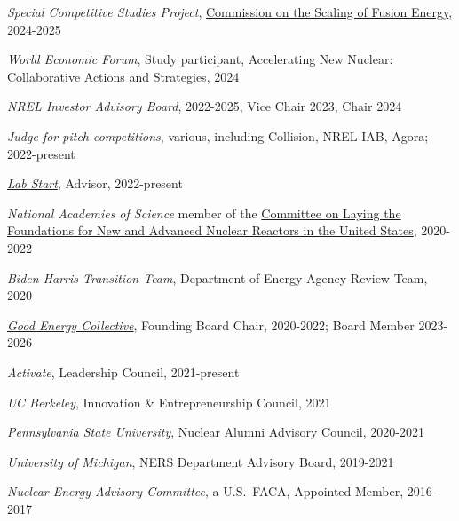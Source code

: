 \textit{Special Competitive Studies Project}, \href{https://www.scsp.ai/fusion/}{Commission on the Scaling of Fusion Energy}, 2024-2025

\textit{World Economic Forum}, Study participant, Accelerating New Nuclear: Collaborative Actions and Strategies, 2024

\textit{NREL Investor Advisory Board}, 2022-2025, Vice Chair 2023, Chair 2024

\textit{Judge for pitch competitions}, various, including Collision, NREL IAB, Agora; 2022-present

\textit{\href{https://www.labstart.xyz/}{Lab Start}}, Advisor, 2022-present

\textit{National Academies of Science} member of the \href{https://www.nationalacademies.org/our-work/laying-the-foundation-for-new-and-advanced-nuclear-reactors-in-the-united-states#sectionCommittee}{Committee on Laying the
Foundations for New and Advanced Nuclear Reactors in the United States},
2020-2022

\textit{Biden-Harris Transition Team}, Department of Energy Agency Review Team, 2020

\textit{\href{https://www.goodenergycollective.org/}{Good Energy Collective}},
Founding Board Chair, 2020-2022; Board Member 2023-2026

\textit{Activate}, Leadership Council, 2021-present

\textit{UC Berkeley}, Innovation \&  Entrepreneurship Council, 2021

\textit{Pennsylvania State University}, Nuclear Alumni Advisory Council, 2020-2021

\textit{University of Michigan}, NERS Department Advisory Board, 2019-2021


\textit{Nuclear Energy Advisory Committee}, a U.S.\ FACA, Appointed Member, 2016-2017


